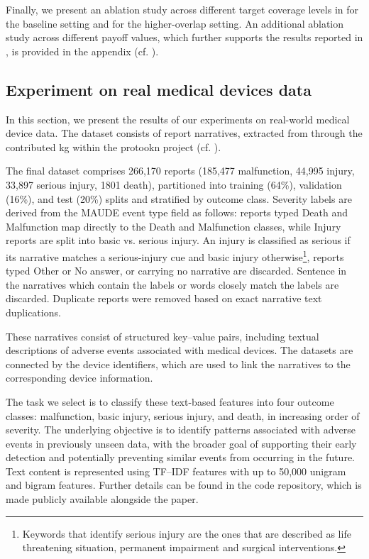 Finally, we present an ablation study across different target coverage levels in  for the baseline setting and  for the higher-overlap setting. An additional ablation study across different payoff values, which further supports the results reported in , is provided in the appendix (cf. ).



\subsection{Experiment on real medical devices data}
\label{subsec:real-medical-devices-data}

In this section, we present the results of our experiments on real-world medical device data. The dataset consists of report narratives, extracted from \cite{fda_maude,fda_510k} through the contributed \gls*{kg} within the \gls*{protookn} project (cf. \cite{protookn}).

The final dataset comprises 266,170 reports (185,477 malfunction, 44,995 injury, 33,897 serious injury, 1801 death), partitioned into training (64\%), validation (16\%), and test (20\%) splits and stratified by outcome class. Severity labels are derived from the MAUDE event type field as follows: reports typed Death and Malfunction map directly to the Death and Malfunction classes, while Injury reports are split into basic vs. serious injury. An injury is classified as serious if its narrative matches a serious-injury cue and basic injury otherwise\footnote{Keywords that identify serious injury are the ones that are described as life threatening situation, permanent impairment and surgical interventions.}, reports typed Other or No answer, or carrying no narrative are discarded. Sentence in the narratives which contain the labels or words closely match the labels are discarded. Duplicate reports were removed based on exact narrative text duplications.

These narratives consist of structured key--value pairs, including textual descriptions of adverse events associated with medical devices. The datasets are connected by the device identifiers, which are used to link the narratives to the corresponding device information.

The task we select is to classify these text-based features into four outcome classes: malfunction, basic injury, serious injury, and death, in increasing order of severity. The underlying objective is to identify patterns associated with adverse events in previously unseen data, with the broader goal of supporting their early detection and potentially preventing similar events from occurring in the future.
Text content is represented using TF--IDF features with up to 50,000 unigram and bigram features. Further details can be found in the code repository, which is made publicly available alongside the paper.

